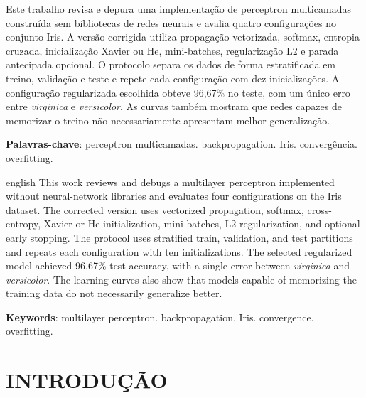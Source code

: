 \documentclass[12pt,a4paper,oneside,openany,chapter=TITLE,section=TITLE,subsection=TITLE,brazil]{abntex2}
\newcommand{\pct}[1]{#1\%}
\begin{document}
\pretextual
\imprimircapa
\imprimirfolhaderosto*

\begin{resumo}[Resumo]
Este trabalho revisa e depura uma implementação de perceptron multicamadas construída sem bibliotecas de redes neurais e avalia quatro configurações no conjunto Iris. A versão corrigida utiliza propagação vetorizada, softmax, entropia cruzada, inicialização Xavier ou He, mini-batches, regularização L2 e parada antecipada opcional. O protocolo separa os dados de forma estratificada em treino, validação e teste e repete cada configuração com dez inicializações. A configuração regularizada escolhida obteve \pct{96,67} no teste, com um único erro entre \textit{virginica} e \textit{versicolor}. As curvas também mostram que redes capazes de memorizar o treino não necessariamente apresentam melhor generalização.

\vspace{\onelineskip}
\noindent
\textbf{Palavras-chave}: perceptron multicamadas. backpropagation. Iris. convergência. overfitting.
\end{resumo}

\begin{resumo}[Abstract]
\begin{otherlanguage*}{english}
This work reviews and debugs a multilayer perceptron implemented without neural-network libraries and evaluates four configurations on the Iris dataset. The corrected version uses vectorized propagation, softmax, cross-entropy, Xavier or He initialization, mini-batches, L2 regularization, and optional early stopping. The protocol uses stratified train, validation, and test partitions and repeats each configuration with ten initializations. The selected regularized model achieved 96.67\% test accuracy, with a single error between \textit{virginica} and \textit{versicolor}. The learning curves also show that models capable of memorizing the training data do not necessarily generalize better.

\vspace{\onelineskip}
\noindent
\textbf{Keywords}: multilayer perceptron. backpropagation. Iris. convergence. overfitting.
\end{otherlanguage*}
\end{resumo}

\tableofcontents*
\cleardoublepage

\textual

\chapter{INTRODUÇÃO}
\end{document}

